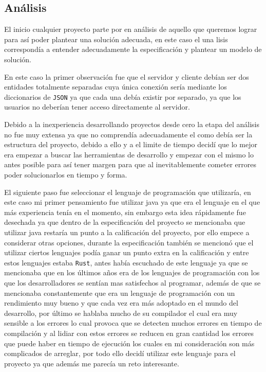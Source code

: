 \documentclass[12pt, titlepage]{article}
\begin{document}
\subsection{Análisis}
El inicio cualquier proyecto parte por en análisis de aquello que queremos lograr para así poder plantear una solución adecuada, en este caso el una lisis correspondía a entender adecuadamente la especificación y plantear un modelo de solución.

En este caso la primer observación fue que el servidor y cliente debían ser dos entidades totalmente separadas cuya única conexión sería mediante los diccionarios de \lstinline|JSON| ya que cada una debía existir por separado, ya que los usuarios no deberían tener acceso directamente al servidor.

Debido a la inexperiencia desarrollando proyectos desde cero la etapa del análisis no fue muy extensa ya que no comprendía adecuadamente el como debía ser la estructura del proyecto, debido a ello y a el limite de tiempo decidí que lo mejor era empezar a buscar las herramientas de desarrollo y empezar con el mismo lo antes posible para así tener margen para que al inevitablemente cometer errores poder solucionarlos en tiempo y forma.

El siguiente paso fue seleccionar el lenguaje de programación que utilizaría, en este caso mi primer pensamiento fue utilizar java ya que era el lenguaje en el que más experiencia tenía en el momento, sin embargo esta idea rápidamente fue desechada ya que dentro de la especificación del proyecto se mencionaba que utilizar java restaría un punto a la calificación del proyecto, por ello empece a considerar otras opciones, durante la especificación también se mencionó que el utilizar ciertos lenguajes podía ganar un punto extra en la calificación y entre estos lenguajes estaba \lstinline|Rust|, antes había escuchado de este lenguaje ya que se mencionaba que en los últimos años era de los lenguajes de programación con los que los desarrolladores se sentían mas satisfechos al programar, además de que se mencionaba constantemente que era un lenguaje de programación con un rendimiento muy bueno y que cada vez era más adoptado en el mundo del desarrollo, por último se hablaba mucho de su compilador el cual era muy sensible a los errores lo cual provoca que se detecten muchos errores en tiempo de compilación y al lidiar con estos errores se reducen en gran cantidad los errores que puede haber en tiempo de ejecución los cuales en mi consideración son más complicados de arreglar, por todo ello decidí utilizar este lenguaje para el proyecto ya que además me parecía un reto interesante.
\end{document}
